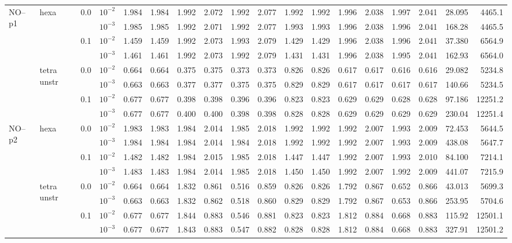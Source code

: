 \begin{longtable}{llclrrrrrrrrrrrrrr}
\multirow{8}{*}{NO--p1} & \multirow{4}{*}{hexa} & \multirow{2}{*}{0.0} & $10^{-2}$ & 1.984 & 1.984 & 1.992 & 2.072 & 1.992 & 2.077 & 1.992 & 1.992 & 1.996 & 2.038 & 1.997 & 2.041 & 28.095 & 4465.1 \\
& & & $10^{-3}$ & 1.985 & 1.985 & 1.992 & 2.071 & 1.992 & 2.077 & 1.993 & 1.993 & 1.996 & 2.038 & 1.996 & 2.041 & 168.28 & 4465.5 \\\cline{3-18}
& & \multirow{2}{*}{0.1} & $10^{-2}$ & 1.459 & 1.459 & 1.992 & 2.073 & 1.993 & 2.079 & 1.429 & 1.429 & 1.996 & 2.038 & 1.996 & 2.041 & 37.380 & 6564.9 \\
& & & $10^{-3}$ & 1.461 & 1.461 & 1.992 & 2.073 & 1.992 & 2.079 & 1.431 & 1.431 & 1.996 & 2.038 & 1.995 & 2.041 & 162.93 & 6564.0 \\\cline{2-18}
& \multirow{4}{*}{tetra unstr} & \multirow{2}{*}{0.0} & $10^{-2}$ & 0.664 & 0.664 & 0.375 & 0.375 & 0.373 & 0.373 & 0.826 & 0.826 & 0.617 & 0.617 & 0.616 & 0.616 & 29.082 & 5234.8 \\
& & & $10^{-3}$ & 0.663 & 0.663 & 0.377 & 0.377 & 0.375 & 0.375 & 0.829 & 0.829 & 0.617 & 0.617 & 0.617 & 0.617 & 140.66 & 5234.5 \\\cline{3-18}
& & \multirow{2}{*}{0.1} & $10^{-2}$ & 0.677 & 0.677 & 0.398 & 0.398 & 0.396 & 0.396 & 0.823 & 0.823 & 0.629 & 0.629 & 0.628 & 0.628 & 97.186 & 12251.2 \\
& & & $10^{-3}$ & 0.677 & 0.677 & 0.400 & 0.400 & 0.398 & 0.398 & 0.828 & 0.828 & 0.629 & 0.629 & 0.629 & 0.629 & 230.04 & 12251.4 \\\hline

\multirow{8}{*}{NO--p2} & \multirow{4}{*}{hexa} & \multirow{2}{*}{0.0} & $10^{-2}$ & 1.983 & 1.983 & 1.984 & 2.014 & 1.985 & 2.018 & 1.992 & 1.992 & 1.992 & 2.007 & 1.993 & 2.009 & 72.453 & 5644.5 \\
& & & $10^{-3}$ & 1.984 & 1.984 & 1.984 & 2.014 & 1.984 & 2.018 & 1.992 & 1.992 & 1.992 & 2.007 & 1.993 & 2.009 & 438.08 & 5647.7 \\\cline{3-18}
& & \multirow{2}{*}{0.1} & $10^{-2}$ & 1.482 & 1.482 & 1.984 & 2.015 & 1.985 & 2.018 & 1.447 & 1.447 & 1.992 & 2.007 & 1.993 & 2.010 & 84.100 & 7214.1 \\
& & & $10^{-3}$ & 1.483 & 1.483 & 1.984 & 2.014 & 1.985 & 2.018 & 1.450 & 1.450 & 1.992 & 2.007 & 1.992 & 2.009 & 441.07 & 7215.9 \\\cline{2-18}
& \multirow{4}{*}{tetra unstr} & \multirow{2}{*}{0.0} & $10^{-2}$ & 0.664 & 0.664 & 1.832 & 0.861 & 0.516 & 0.859 & 0.826 & 0.826 & 1.792 & 0.867 & 0.652 & 0.866 & 43.013 & 5699.3 \\
& & & $10^{-3}$ & 0.663 & 0.663 & 1.832 & 0.862 & 0.518 & 0.860 & 0.829 & 0.829 & 1.792 & 0.867 & 0.653 & 0.866 & 253.95 & 5704.6 \\\cline{3-18}
& & \multirow{2}{*}{0.1} & $10^{-2}$ & 0.677 & 0.677 & 1.844 & 0.883 & 0.546 & 0.881 & 0.823 & 0.823 & 1.812 & 0.884 & 0.668 & 0.883 & 115.92 & 12501.1 \\
& & & $10^{-3}$ & 0.677 & 0.677 & 1.843 & 0.883 & 0.547 & 0.882 & 0.828 & 0.828 & 1.812 & 0.884 & 0.668 & 0.883 & 327.91 & 12501.2 \\\hline


\end{longtable}
